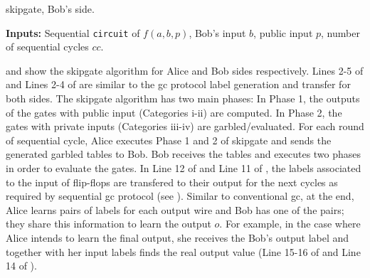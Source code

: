 \begin{algorithm}
\caption{\gls{skipgate}, Bob's side.}\label{alg:bob}
\textbf{Inputs:} Sequential \texttt{circuit} of $f(a,b,p)$, Bob's input $b$, public input $p$, number of sequential cycles $cc$.\\
\begin{algorithmic}[1]
\ENDFOR
{}
\end{algorithmic}
\end{algorithm}

 and  show the \gls{skipgate} algorithm for Alice and Bob sides respectively.
Lines 2-5 of  and Lines 2-4 of  are similar to the \acrshort{gc} protocol label generation and transfer for both sides.
The \gls{skipgate} algorithm has two main phases:
In Phase 1, the outputs of the gates with public input (Categories i-ii) are computed.
In Phase 2, the gates with private inputs (Categories iii-iv) are  garbled/evaluated.
For each round of sequential cycle, Alice executes Phase 1 and 2 of \gls{skipgate} and sends the generated garbled tables to Bob.
Bob receives the tables and executes two phases in order to evaluate the gates.
In Line 12 of  and Line 11 of , the labels associated to the input of flip-flops are transfered to their output for the next cycles as required by sequential \acrshort{gc} protocol (see ).
Similar to conventional \acrshort{gc}, at the end, Alice learns pairs of labels for each output wire and Bob has one of the pairs; they share this information to learn the output $o$.
For example, in the case where Alice intends to learn the final output, she receives the Bob's output label and together with her input labels finds the real output value (Line 15-16 of  and Line 14 of ).

